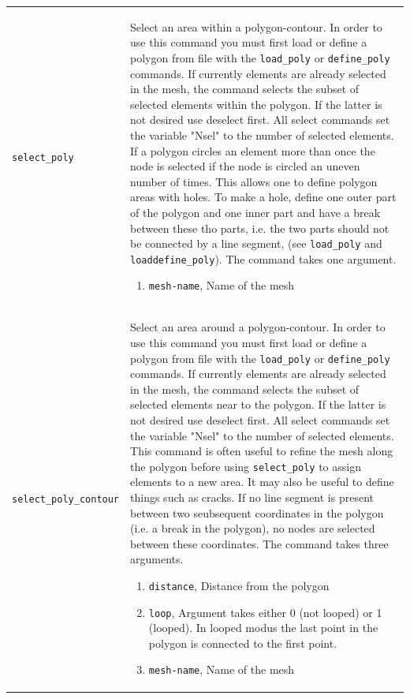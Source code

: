 \documentclass[noshowpacs,preprintnumbers,amsmath,amssymb, letter]{revtex4}
\begin{document}
\begin{longtable}{p{}p{}}
\texttt{select\_poly}	& Select an area within a polygon-contour. In order to use this command you must first load or define a polygon from file with the \texttt{load\_poly} or \texttt{define\_poly} commands. If currently elements are already selected in the mesh, the command selects the subset of selected elements within the polygon. If the latter is not desired use deselect first. All select commands set the variable "Nsel" to the number of selected elements. If a polygon circles an element more than once the node is selected if the node is circled an uneven number of times. This allows one to define polygon areas with holes. To make a hole, define one outer part of the polygon and one inner part and have a break between these tho parts, i.e. the two parts should not be connected by a line segment, (see \texttt{load\_poly} and \texttt{loaddefine\_poly}). The command takes one argument.
\begin{enumerate}
\item \texttt{mesh-name}, Name of the mesh
\end{enumerate}\\
\texttt{select\_poly\_contour}	& Select an area around a polygon-contour. In order to use this command you must first load or define a polygon from file with the \texttt{load\_poly} or \texttt{define\_poly} commands. If currently elements are already selected in the mesh, the command selects the subset of selected elements near to the polygon. If the latter is not desired use deselect first. All select commands set the variable "Nsel" to the number of selected elements. This command is often useful to refine the mesh along the polygon before using \texttt{select\_poly} to assign elements to a new area. It may also be useful to define things such as cracks. If no line segment is present between two seubsequent coordinates in the polygon (i.e. a break in the polygon), no nodes are selected between these coordinates. The command takes three arguments.
\begin{enumerate}
\item \texttt{distance}, Distance from the polygon
\item \texttt{loop}, Argument takes either 0 (not looped) or 1 (looped). In looped modus the last point in the polygon is connected to the first point.
\item \texttt{mesh-name}, Name of the mesh
\end{enumerate}\\

\end{longtable}
\end{document}
